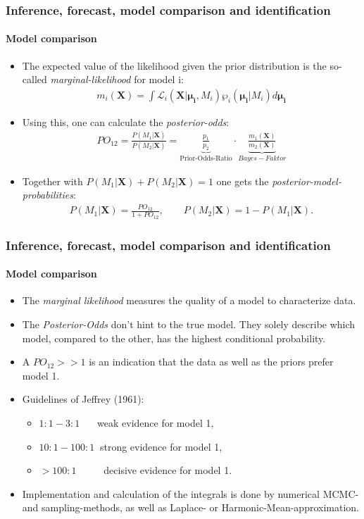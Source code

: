 \documentclass{beamer} %
\begin{document}
\begin{frame}\frametitle{Inference, forecast, model comparison and identification}\framesubtitle{Model comparison}
  \begin{itemize}
      \item The expected value of the likelihood given the prior distribution is the so-called \emph{marginal-likelihood} for model i:
    \begin{align*}
      m_i(\mathbf{X}) = \int \mathcal{L}_i(\mathbf{X}|\boldsymbol{\mu_i},M_i)\wp_i(\boldsymbol{\mu_i}|M_i)d\boldsymbol{\mu_i}
    \end{align*}
    \item Using this, one can calculate the \emph{posterior-odds}:
    \begin{align*}
      PO_{12} = \frac{P(M_1|\mathbf{X})}{P(M_2|\mathbf{X})} = \underbrace{\frac{p_1}{p_2}}_{\text{Prior-Odds-Ratio}}\cdot \underbrace{\frac{m_1(\mathbf{X})}{m_2(\mathbf{X})}}_{Bayes-Faktor}
    \end{align*}
    \item Together with $P(M_1|\mathbf{X}) + P(M_2|\mathbf{X}) =1$ one gets the \emph{posterior-model-probabilities}:
    \begin{align*}
      P(M_1|\mathbf{X}) = \frac{PO_{12}}{1+PO_{12}}, \qquad P(M_2|\mathbf{X}) = 1-P(M_1|\mathbf{X}).
    \end{align*}
  \end{itemize}
\end{frame}

\begin{frame}\frametitle{Inference, forecast, model comparison and identification}\framesubtitle{Model comparison}
  \begin{itemize}
    \item The \emph{marginal likelihood} measures the quality of a model to characterize data.
    \item The \emph{Posterior-Odds} don't hint to the true model. They solely describe which model, compared to the other, has the highest conditional probability.
    \item A $PO_{12}>>1$ is an indication that the data as well as the priors prefer model 1.
    \item Guidelines of Jeffrey (1961):
    \begin{itemize}
      \item $1:1 - 3:1\quad~~$ weak evidence for model 1,
      \item $10:1 - 100:1~$ strong evidence for model 1,
      \item $> 100:1\qquad~~$ decisive evidence for model 1.
    \end{itemize}
    \item Implementation and calculation of the integrals is done by numerical MCMC- and sampling-methods, as well as Laplace- or Harmonic-Mean-approximation.
  \end{itemize}
\end{frame}
\end{document}

